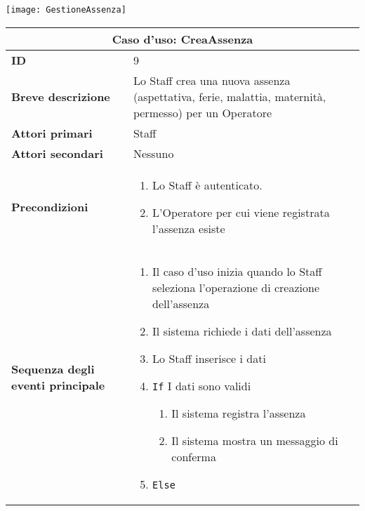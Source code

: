 \documentclass[a4paper]{report}
\begin{document}
\begin{figure*}[ht]
    \centering
    \texttt{[image: GestioneAssenza]}
\end{figure*}

\clearpage
\renewcommand{\arraystretch}{1.9}
\begin{table}[H]
\vspace*{-0cm}
\begin{tabular}{|p{3.9cm}|p{9.9cm}|}
\hline
\multicolumn{2}{|c|}{\textbf{Caso d’uso: CreaAssenza}} \\ \hline
\textbf{ID} & 9 \\ \hline
\textbf{Breve descrizione} & Lo Staff crea una nuova assenza (aspettativa, ferie, malattia, maternità, permesso) per un Operatore \\ \hline
\textbf{Attori primari} & Staff \\ \hline
\textbf{Attori secondari} & Nessuno \\ \hline
\textbf{Precondizioni} & \begin{enumerate}[leftmargin=14pt,label=\arabic*.,labelsep=0.5em,topsep=0pt,partopsep=0pt,parsep=0pt,itemsep=0pt]
    \item Lo Staff è autenticato.
    \item L’Operatore per cui viene registrata l’assenza esiste
\end{enumerate} \\ \hline
\textbf{Sequenza degli eventi principale} & \begin{enumerate}[leftmargin=14pt,label=\arabic*.,labelsep=0.5em,topsep=0pt,partopsep=0pt,parsep=0pt,itemsep=0pt]
    \item Il caso d’uso inizia quando lo Staff seleziona l'operazione di creazione dell'assenza
    \item Il sistema richiede i dati dell’assenza
    \item Lo Staff inserisce i dati
    \item \texttt{If} I dati sono validi
    \begin{enumerate}[label=\arabic{enumi}.\arabic*.,leftmargin=22pt,labelsep=0.5em,topsep=0pt,partopsep=0pt,parsep=0pt,itemsep=0pt]
        \item Il sistema registra l’assenza
        \item Il sistema mostra un messaggio di conferma
    \end{enumerate}
    \item \texttt{Else}
    \begin{enumerate}[label=\arabic{enumi}.\arabic*.,leftmargin=22pt,labelsep=0.5em,topsep=0pt,partopsep=0pt,parsep=0pt,itemsep=0pt]

\end{enumerate}
\end{enumerate}
\end{tabular}
\end{table}
\end{document}
